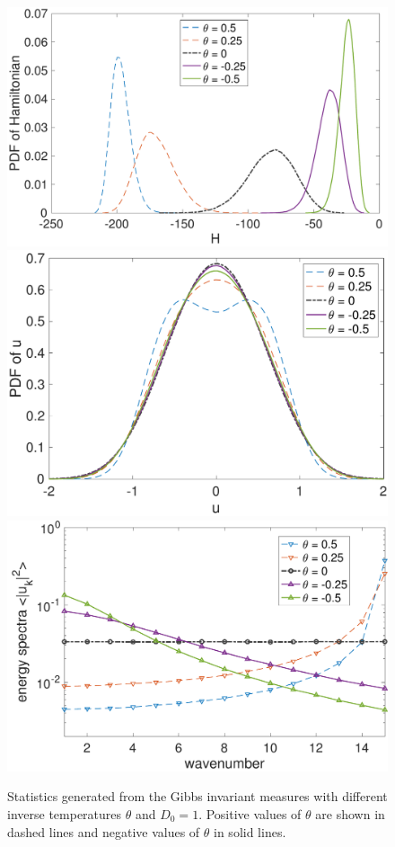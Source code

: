 \documentclass[9pt,twoside,lineno]{pnas-new}
\theoremstyle{plain}
\theoremstyle{plain}
\begin{document}
\begin{figure}
\begin{centering}
\includegraphics[scale=0.27]{./pdf0_hamil}\includegraphics[scale=0.27]{./pdf0_u}\includegraphics[scale=0.27]{./spec0}
\par\end{centering}
\caption{Statistics generated from the Gibbs invariant measures with different
inverse temperatures $\theta$ and $D_{0}=1$. Positive values of
$\theta$ are shown in dashed lines and negative values of $\theta$
in solid lines.\label{fig:Test-distributions}}
\end{figure}
\end{document}
